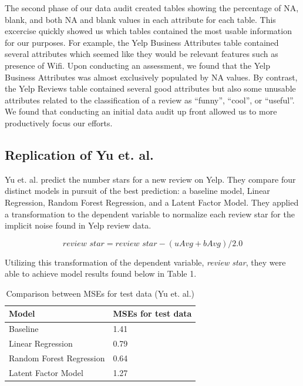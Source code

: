 \documentclass[12pt]{article}
\begin{document}
The second phase of our data audit created tables showing the percentage of NA, blank, and
both NA and blank values in each attribute for each table. This excercise quickly showed us
which tables contained the most usable information for our purposes. For example, the Yelp
Business Attributes table contained several attributes which seemed like they would be
relevant features such as presence of Wifi. Upon conducting an assessment, we found that
the Yelp Business Attributes was almost exclusively populated by NA values. By contrast, the
Yelp Reviews table contained several good attributes but also some unusable attributes
related to the classification of a review as ``funny'', ``cool'', or ``useful''. We found
that conducting an initial data audit up front allowed us to more productively focus our
efforts.

\subsection{Replication of Yu et. al.}

Yu et. al. \cite{yu2015restaurants} predict the number stars for a new review on Yelp.
They compare four distinct models in pursuit of the best prediction: a baseline model,
Linear Regression, Random Forest Regression, and a Latent Factor Model. They applied a
transformation to the dependent variable to normalize each review star for the implicit
noise found in Yelp review data.

\[
\textit{review star} = \textit{review star} - (uAvg + bAvg)/2.0
\]

Utilizing this transformation of the dependent variable, \textit{review star}, they were
able to achieve model results found below in Table 1.

\begin{table}[h]
  \caption{\label{tab:rep-models}Comparison between MSEs for test data (Yu et. al.)}
  \centering
  \begin{tabular}{|l|l|}
    \hline
    \textbf{Model} & \textbf{MSEs for test data} \\
    \hline
    Baseline & 1.41 \\
    \hline
    Linear Regression & 0.79 \\
    \hline
    Random Forest Regression & 0.64 \\
    \hline
    Latent Factor Model & 1.27 \\
    \hline
  \end{tabular}
\end{table}
\end{document}
